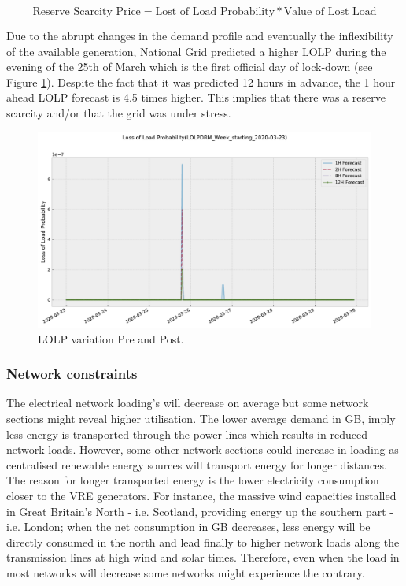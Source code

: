 \documentclass[energies,article,submit,moreauthors,pdftex]{Definitions/mdpi}
\begin{document}
\[ \text{Reserve Scarcity Price} = \text{Lost of Load Probability} * \text{Value of Lost Load} \]

Due to the abrupt changes in the demand profile and eventually the inflexibility of the available generation, National Grid predicted a higher LOLP during the evening of the 25th of March which is the first official day of lock-down (see Figure \ref{fig:LOLP_25_03}). Despite the fact that it was predicted 12 hours in advance, the 1 hour ahead LOLP forecast is 4.5 times higher. This implies that there was a reserve scarcity and/or that the grid was under stress.

\begin{figure}[H]\centering
\hspace{-25pt}\includegraphics[width=15 cm]{Graphics/LOLPDRM_Week_starting_2020-03-23no4H.pdf}
\caption{LOLP variation Pre and Post.}\label{fig:LOLP_25_03}
\end{figure}  

\subsubsection{Network constraints}\label{section: network constraints}
The electrical network loading's will decrease on average but some network sections might reveal higher utilisation. The lower average demand in GB, imply less energy is transported through the power lines which results in reduced network loads. However, some other network sections could increase in loading as centralised renewable energy sources will transport energy for longer distances. The reason for longer transported energy is the lower electricity consumption closer to the VRE generators. For instance, the massive wind capacities installed in Great Britain's North - i.e. Scotland, providing energy up the southern part - i.e. London; when the net consumption in GB decreases, less energy will be directly consumed in the north and lead finally to higher network loads along the transmission lines at high wind and solar times. Therefore, even when the load in most networks will decrease some networks might experience the contrary.
\end{document}

